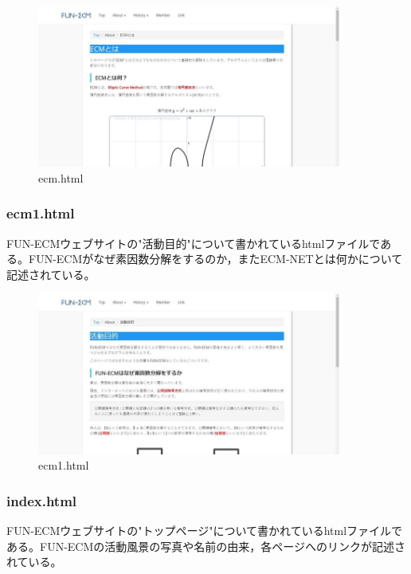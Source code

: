 \documentclass[openany,11pt,papersize]{jsbook}
\begin{document}
\begin{figure}[H]
  \begin{center} %
    \includegraphics[clip, width=10.0cm]{./figure/ecm.png}
    \caption{ecm.html} %
    \label{ecm} %
  \end{center}
\end{figure}

\subsubsection{ecm1.html}
FUN-ECMウェブサイトの"活動目的"について書かれているhtmlファイルである。FUN-ECMがなぜ素因数分解をするのか，またECM-NETとは何かについて記述されている。

\begin{figure}[H]
  \begin{center} %
    \includegraphics[clip, width=10.0cm]{./figure/ecm1.png}
    \caption{ecm1.html} %
    \label{ecm1} %
  \end{center}
\end{figure}

\subsubsection{index.html}
FUN-ECMウェブサイトの"トップページ"について書かれているhtmlファイルである。FUN-ECMの活動風景の写真や名前の由来，各ページへのリンクが記述されている。
\end{document}
